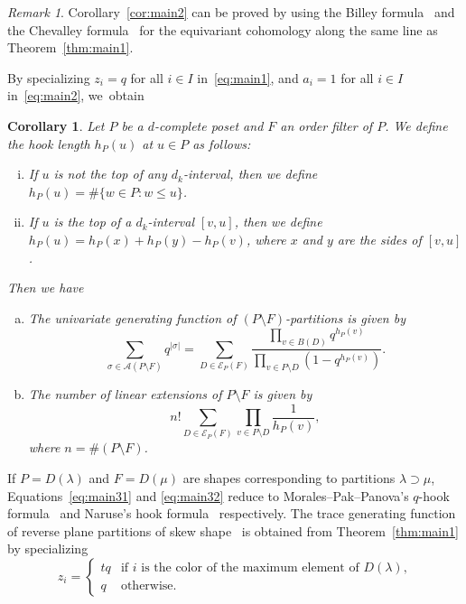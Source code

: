 \documentclass[10pt]{amsart}
\newtheorem{coro}[theo]{Corollary}
\theoremstyle{definition}
\theoremstyle{remark}
\newtheorem{rema}[theo]{Remark}
\newcommand\AP{\mathcal{A}}
\newcommand\EE{\mathcal{E}}
\begin{document}
\begin{rema}
Corollary~\ref{cor:main2} can be proved by using the Billey formula~\cite[Theorem~4]{B} 
and the Chevalley formula~\cite[Theorem~11.1.7 and Corollary~11.3.17]{Ku} 
for the equivariant cohomology along the same line as Theorem~\ref{thm:main1}.
\end{rema}

By specializing $z_i = q$ for all $i \in I$ in~\eqref{eq:main1}, 
and $a_i = 1$ for all $i \in I$ in~\eqref{eq:main2}, we~obtain

\begin{coro}
\label{cor:main3}
Let $P$ be a $d$-complete poset and $F$ an order filter of $P$.
We define the hook length $h_P(u)$ at $u \in P$ as follows:
\begin{enumerate}[(i)]
\item\label{coro5.6_i} %
If $u$ is not the top of any $d_k$-interval, then we define $h_P(u) = \# \{ w \in P : w \le u \}$.
\item\label{coro5.6_ii} %
If $u$ is the top of a $d_k$-interval $[v,u]$, then we define 
$h_P(u) = h_P(x) + h_P(y) - h_P(v)$, 
where $x$ and $y$ are the sides of $[v,u]$.
\end{enumerate}
Then we have
\begin{enumerate}[(a)]
\item\label{coro5.6_a} %
The univariate generating function of $(P \setminus F)$-partitions is given by
\begin{equation}
\label{eq:main31}
\sum_{\sigma \in \AP(P \setminus F)}
 q^{|\sigma|}
 =
\sum_{D \in \EE_P(F)}
\frac{ \prod_{v \in B(D)} q^{h_P(v)} }
         { \prod_{v \in P \setminus D} (1-q^{h_P(v)}) }.
\end{equation}
\item\label{coro5.6_b} %
The number of linear extensions of $P \setminus F$ is given by
\begin{equation}
\label{eq:main32}
n! \sum_{D \in \EE_P(F)} \prod_{v \in P \setminus D} \frac{1}{h_P(v)},
\end{equation}
where $n = \# (P \setminus F)$.
\end{enumerate}
\end{coro}

If $P = D(\lambda)$ and $F = D(\mu)$ are shapes corresponding to partitions $\lambda \supset \mu$,
Equations~\eqref{eq:main31} and \eqref{eq:main32} reduce to 
Morales--Pak--Panova's $q$-hook formula~\cite[Corollary~6.17]{MPP} and Naruse's hook formula~\cite{Naruse} 
respectively.
The trace generating function of reverse plane partitions of skew shape~\cite[Corollary~6.20]{MPP}
is obtained from Theorem~\ref{thm:main1} by specializing
$$
z_i = \begin{cases}
 tq &\text{if $i$ is the color of the maximum element of $D(\lambda)$,} \\
 q &\text{otherwise.}
\end{cases}
$$
\end{document}
